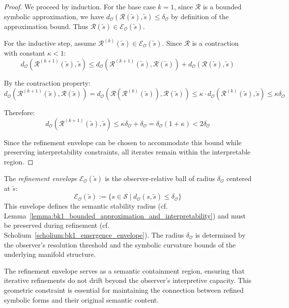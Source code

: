 \begin{proof}
\label{proof:bk4_interpretability_preservation}
We proceed by induction. For the base case $k=1$, since $\mathcal{R}$ is a bounded symbolic approximation, we have $d_{\mathcal{O}}(\mathcal{R}(\tilde{s}), \tilde{s}) \le \delta_{\mathcal{O}}$ by definition of the approximation bound. Thus $\mathcal{R}(\tilde{s}) \in \mathcal{E}_{\mathcal{O}}(\tilde{s})$.

For the inductive step, assume $\mathcal{R}^{(k)}(\tilde{s}) \in \mathcal{E}_{\mathcal{O}}(\tilde{s})$. Since $\mathcal{R}$ is a contraction with constant $\kappa < 1$:
\[
d_{\mathcal{O}}(\mathcal{R}^{(k+1)}(\tilde{s}), \tilde{s}) \le d_{\mathcal{O}}(\mathcal{R}^{(k+1)}(\tilde{s}), \mathcal{R}(\tilde{s})) + d_{\mathcal{O}}(\mathcal{R}(\tilde{s}), \tilde{s})
\]

By the contraction property:
\[
d_{\mathcal{O}}(\mathcal{R}^{(k+1)}(\tilde{s}), \mathcal{R}(\tilde{s})) = d_{\mathcal{O}}(\mathcal{R}(\mathcal{R}^{(k)}(\tilde{s})), \mathcal{R}(\tilde{s})) \le \kappa \cdot d_{\mathcal{O}}(\mathcal{R}^{(k)}(\tilde{s}), \tilde{s}) \le \kappa \delta_{\mathcal{O}}
\]

Therefore:
\[
d_{\mathcal{O}}(\mathcal{R}^{(k+1)}(\tilde{s}), \tilde{s}) \le \kappa \delta_{\mathcal{O}} + \delta_{\mathcal{O}} = \delta_{\mathcal{O}}(1 + \kappa) < 2\delta_{\mathcal{O}}
\]

Since the refinement envelope can be chosen to accommodate this bound while preserving interpretability constraints, all iterates remain within the interpretable region.
\end{proof}

\begin{definition}
\label{definition:bk4_refinement_envelope}
The \emph{refinement envelope} $\mathcal{E}_{\mathcal{O}}(\tilde{s})$ is the observer-relative ball of radius $\delta_{\mathcal{O}}$ centered at $\tilde{s}$:
\[
\mathcal{E}_{\mathcal{O}}(\tilde{s}) := \{ s \in \mathcal{S} \mid d_{\mathcal{O}}(s, \tilde{s}) \le \delta_{\mathcal{O}} \}
\]
This envelope defines the semantic stability radius (cf. Lemma~\ref{lemma:bk1_bounded_approximation_and_interpretability}) and must be preserved during refinement (cf. Scholium~\ref{scholium:bk1_emergence_envelope}). The radius $\delta_{\mathcal{O}}$ is determined by the observer's resolution threshold and the symbolic curvature bounds of the underlying manifold structure.
\end{definition}

The refinement envelope serves as a semantic containment region, ensuring that iterative refinements do not drift beyond the observer's interpretive capacity. This geometric constraint is essential for maintaining the connection between refined symbolic forms and their original semantic content.

